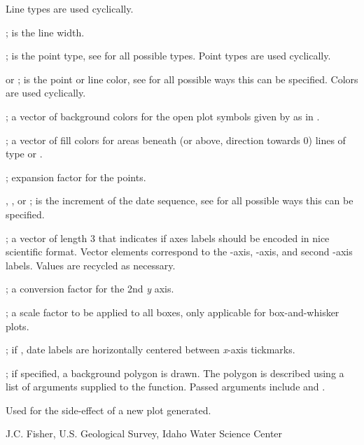 \documentclass[letterpaper]{book}
\begin{document}
\begin{Arguments}
\begin{ldescription}
Line types are used cyclically.
\item[\code{lwd}] ; is the line width.
\item[\code{pch}] ; is the point type, see  for all possible types.
Point types are used cyclically.
\item[\code{col}]  or ; is the point or line color, see  for all possible ways this can be specified.
Colors are used cyclically.
\item[\code{bg}] ; a vector of background colors for the open plot symbols given by  as in .
\item[\code{fill}] ; a vector of fill colors for areas beneath (or above, direction towards 0) lines of type  or .
\item[\code{pt.cex}] ; expansion factor for the points.
\item[\code{seq.date.by}] , , or ; is the increment of the date sequence, see  for all possible ways this can be specified.
\item[\code{scientific}] ; a vector of length 3 that indicates if axes labels should be encoded in nice scientific format.
Vector elements correspond to the -axis, -axis, and second -axis labels.
Values are recycled as necessary.
\item[\code{conversion.factor}] ; a conversion factor for the 2nd \emph{y} axis.
\item[\code{boxwex}] ; a scale factor to be applied to all boxes, only applicable for box-and-whisker plots.
\item[\code{center.date.labels}] ; if , date labels are horizontally centered between \emph{x}-axis tickmarks.
\item[\code{bg.polygon}] ; if specified, a background polygon is drawn.
The polygon is described using a list of arguments supplied to the  function.
Passed arguments include  and .
\end{ldescription}
\end{Arguments}
%
\begin{Value}
Used for the side-effect of a new plot generated.
\end{Value}
%
\begin{Author}\relax
J.C. Fisher, U.S. Geological Survey, Idaho Water Science Center
\end{Author}
\end{document}
